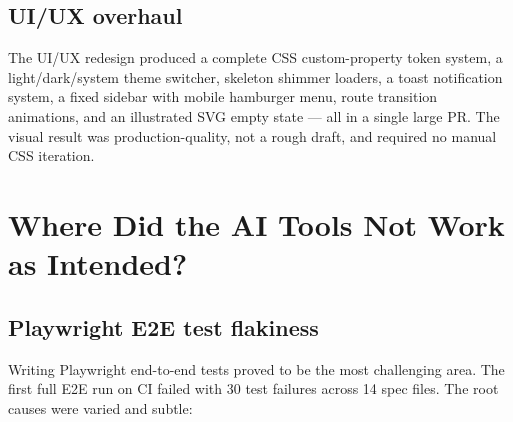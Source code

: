\documentclass[a4paper, 12pt]{article}
\begin{document}
\subsection{UI/UX overhaul}

The UI/UX redesign produced a complete CSS custom-property token system, a light/dark/system
theme switcher, skeleton shimmer loaders, a toast notification system, a fixed sidebar with
mobile hamburger menu, route transition animations, and an illustrated SVG empty state ---
all in a single large PR. The visual result was production-quality, not a rough draft, and
required no manual CSS iteration.

\section{Where Did the AI Tools Not Work as Intended?}

\subsection{Playwright E2E test flakiness}

Writing Playwright end-to-end tests proved to be the most challenging area. The first full
E2E run on CI failed with 30 test failures across 14 spec files. The root causes were varied
and subtle:
\end{document}
